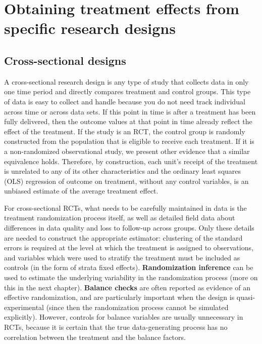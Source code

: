 \section{Obtaining treatment effects from specific research designs}


\subsection{Cross-sectional designs}

A cross-sectional research design is any type of study
that collects data in only one time period
and directly compares treatment and control groups.
This type of data is easy to collect and handle because
you do not need track individual across time or across data sets.
If this point in time is after a treatment has been fully delivered,
then the outcome values at that point in time
already reflect the effect of the treatment.
If the study is an RCT, the control group is randomly constructed
from the population that is eligible to receive each treatment.
If it is a non-randomized observational study, we present other evidence that a similar equivalence holds.
Therefore, by construction, each unit's receipt of the treatment
is unrelated to any of its other characteristics
and the ordinary least squares (OLS) regression
of outcome on treatment, without any control variables,
is an unbiased estimate of the average treatment effect.

For cross-sectional RCTs, what needs to be carefully maintained in data
is the treatment randomization process itself,
as well as detailed field data about differences
in data quality and loss to follow-up across groups.\cite{athey2017econometrics}
Only these details are needed to construct the appropriate estimator:
clustering of the standard errors is required at the level
at which the treatment is assigned to observations,
and variables which were used to stratify the treatment
must be included as controls (in the form of strata fixed effects).
\textbf{Randomization inference} can be used
to estimate the underlying variability in the randomization process
(more on this in the next chapter).
\textbf{Balance checks}
are often reported as evidence of an effective randomization,
and are particularly important when the design is quasi-experimental
(since then the randomization process cannot be simulated explicitly).
However, controls for balance variables are usually unnecessary in RCTs,
because it is certain that the true data-generating process
has no correlation between the treatment and the balance factors.

